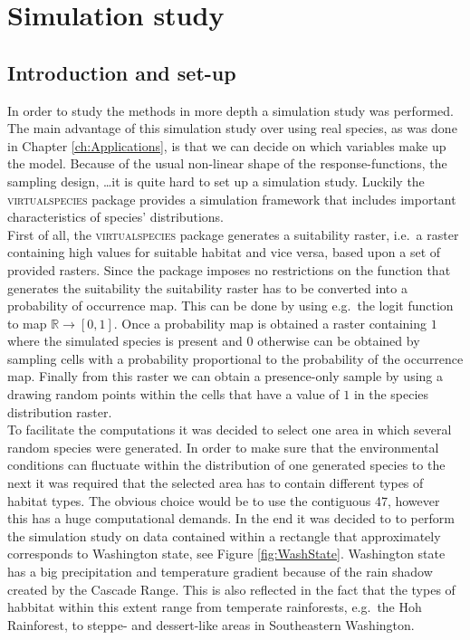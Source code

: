 \chapter{Simulation study}
\label{chap:SimulationStudy}

\section{Introduction and set-up}
In order to study the methods in more depth a simulation study was performed. The main advantage of this simulation study over using real species, as was done in Chapter \ref{ch:Applications}, is that we can decide on which variables make up the model. Because of the usual non-linear shape of the response-functions, the sampling design, \dots it is quite hard to set up a simulation study. Luckily the
\textsc{virtualspecies} package \parencite{virtualspecies, leroy_virtualspecies_2015} provides a simulation framework that includes important characteristics of species' distributions.\\

First of all, the \textsc{virtualspecies} package generates a suitability raster, i.e.\ a raster containing high values for suitable habitat and vice versa, based upon a set of provided rasters. Since the package imposes no restrictions on the function that generates the suitability the suitability raster has to be converted into a probability of occurrence map. This can be done by using e.g.\ the logit function to map $\mathbb{R} \to [0,1]$. Once a probability map is obtained a raster containing $1$ where the simulated species is present and $0$ otherwise can be obtained by sampling cells with a probability proportional to the probability of the occurrence map. Finally from this raster we can obtain a presence-only sample by using a drawing random points within the cells that have a value of $1$ in the species distribution raster.\\

To facilitate the computations it was decided to select one area in which several random species were generated. In order to make sure that the environmental conditions can fluctuate within the distribution of one generated species to the next it was required that the selected area has to contain different types of habitat types. The obvious choice would be to use the contiguous 47, however this has a huge computational demands. In the end it was decided to to perform the simulation study on data contained within a rectangle that approximately corresponds to Washington state, see Figure \ref{fig:WashState}. Washington state has a big precipitation and temperature gradient because of the rain shadow created by the Cascade Range. This is also reflected in the fact that the types of habbitat within this extent range from temperate rainforests, e.g.\ the Hoh Rainforest, to steppe- and dessert-like areas in Southeastern Washington. \\

